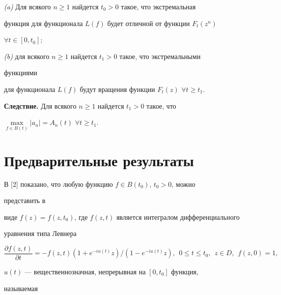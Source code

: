  


\begin{thm} 


{\em (a)} Для всякого $n\ge1$ найдется $t_0>0$ такое, что экстремальная 


функция для функционала $L(f)$ будет отличной от функции $F_t(z^n)$\; 


$\forall t\in[0,t_0];$ 


 


{\em (b)} для всякого $n\ge1$ найдется $t_1>0$ такое, что экстремальными 


функциями 


для функционала $L(f)$ будут вращения функции $F_t(z)$\; $\forall t\ge 


t_1$. 


\end{thm} 


 


{\bf Следствие.} Для всякого $n\ge1$ найдется $t_1>0$ такое, что 


$\max\limits_{f\in B(t)}|a_n|=A_n(t)$\; $\forall t\ge t_1$. 


 


 


\section{Предварительные результаты} 


 


В [2] показано, что любую функцию $f\in B(t_0)$, $t_0>0$, можно 


представить в 


виде $f(z)=f(z,t_0)$, где $f(z,t)$ является интегралом дифференциального 


уравнения типа Левнера 


\begin{equation} 


\frac{\partial f(z,t)}{\partial t}=-f(z,t) 


(1+e^{-i u(t)}z)/(1-e^{-i u(t)}z), 


\ \ 0\le t\le t_0,\ \ z\in D,\ \ f(z,0)=1, 


\end{equation} 


$u(t)$ --- вещественнозначная, непрерывная на $[0,t_0]$ функция, 


называемая 


